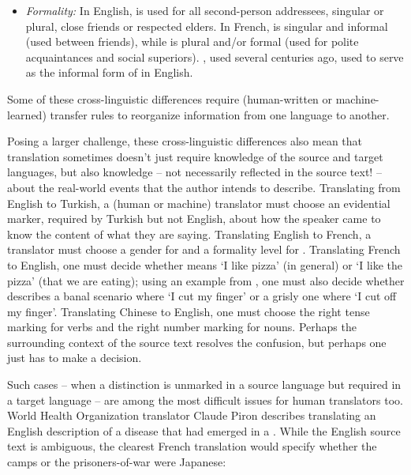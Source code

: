 \begin{itemize}
\item \emph{Formality:}  In English,  is used for all second-person addressees, singular or plural, close friends or respected elders.   In French,  is singular and informal (used between friends), while  is plural and/or formal (used for polite acquaintances and social superiors).  , used several centuries ago, used to serve as the informal form of  in English.

\end{itemize}



Some of these cross-linguistic differences require (human-written or machine-learned) transfer rules to reorganize information from one language to another.

Posing a larger challenge, these cross-linguistic differences also mean that translation sometimes doesn't just require knowledge of the source and target languages, but also knowledge -- not necessarily reflected in the source text! -- about the real-world events that the author intends to describe.
Translating from English to Turkish, a (human or machine) translator must choose an evidential marker, required by Turkish but not English, about how the speaker came to know the content of what they are saying.  Translating English to French, a translator must choose a gender for  and a formality level for  .  Translating French to English, one must decide whether  means `I like pizza' (in general) or `I like the pizza' (that we are eating); using an example from \citet{CohnGoodman:2019}, one must also decide whether  describes a banal scenario where `I cut my finger' or a grisly one where `I cut off my finger'.
 Translating Chinese to English, one must choose the right tense marking for verbs and the right number marking for nouns.    Perhaps the surrounding context of the source text resolves the confusion, but perhaps one just has to make a decision.

Such cases -- when a distinction is unmarked in a source language but required in a target language -- are among the most difficult issues for human translators too.  World Health Organization translator Claude Piron \citep{Piron:1988} describes translating an English description of a disease that had emerged in a .  While the English source text is ambiguous, the clearest French translation would specify whether the camps or the prisoners-of-war were Japanese: 


